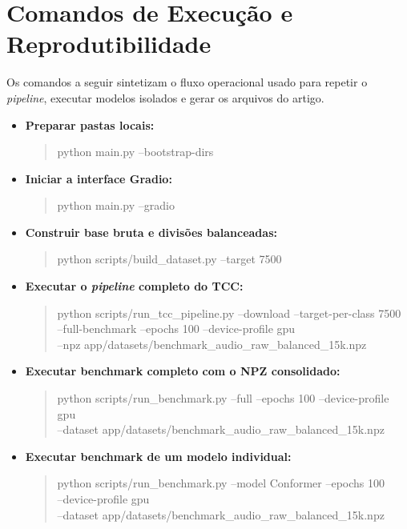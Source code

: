 \documentclass[12pt,a4paper]{article}
\begin{document}
\section{Comandos de Execução e Reprodutibilidade}

Os comandos a seguir sintetizam o fluxo operacional usado para repetir o
\textit{pipeline}, executar modelos isolados e gerar os arquivos do artigo.

\begin{itemize}
    \item \textbf{Preparar pastas locais:}
    \begin{quote}\footnotesize\ttfamily
    python main.py --bootstrap-dirs
    \end{quote}

    \item \textbf{Iniciar a interface Gradio:}
    \begin{quote}\footnotesize\ttfamily
    python main.py --gradio
    \end{quote}

    \item \textbf{Construir base bruta e divisões balanceadas:}
    \begin{quote}\footnotesize\ttfamily
    python scripts/build\_dataset.py --target 7500
    \end{quote}

    \item \textbf{Executar o \textit{pipeline} completo do TCC:}
    \begin{quote}\footnotesize\ttfamily
    python scripts/run\_tcc\_pipeline.py --download --target-per-class 7500\\
    --full-benchmark --epochs 100 --device-profile gpu\\
    --npz app/datasets/benchmark\_audio\_raw\_balanced\_15k.npz
    \end{quote}

    \item \textbf{Executar benchmark completo com o NPZ consolidado:}
    \begin{quote}\footnotesize\ttfamily
    python scripts/run\_benchmark.py --full --epochs 100 --device-profile gpu\\
    --dataset app/datasets/benchmark\_audio\_raw\_balanced\_15k.npz
    \end{quote}

    \item \textbf{Executar benchmark de um modelo individual:}
    \begin{quote}\footnotesize\ttfamily
    python scripts/run\_benchmark.py --model Conformer --epochs 100\\
    --device-profile gpu\\
    --dataset app/datasets/benchmark\_audio\_raw\_balanced\_15k.npz
    \end{quote}


\end{itemize}
\end{document}
